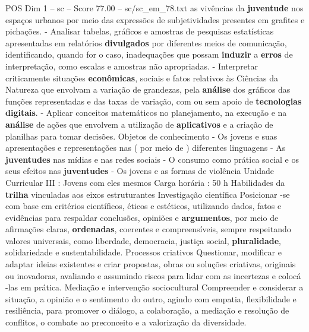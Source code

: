 \begin{textsample}{POS Dim 1 – sc – Score 77.00 – sc/sc\_em\_78.txt}
as vivências da \textbf{juventude} nos espaços urbanos por meio das expressões de subjetividades presentes em grafites e pichações. - Analisar tabelas, gráficos e amostras de pesquisas estatísticas apresentadas em relatórios \textbf{divulgados} por diferentes meios de comunicação, identificando, quando for o caso, inadequações que possam \textbf{induzir} a \textbf{erros} de interpretação, como escalas e amostras não apropriadas. - Interpretar criticamente situações \textbf{econômicas}, sociais e fatos relativos às Ciências da Natureza que envolvam a variação de grandezas, pela \textbf{análise} dos gráficos das funções representadas e das taxas de variação, com ou sem apoio de \textbf{tecnologias} \textbf{digitais}. - Aplicar conceitos matemáticos no planejamento, na execução e na \textbf{análise} de ações que envolvem a utilização de \textbf{aplicativos} e a criação de planilhas para tomar decisões.
Objetos de conhecimento - Os jovens e suas apresentações e representações nas ( por meio de ) diferentes linguagens - As \textbf{juventudes} nas mídias e nas redes sociais - O consumo como prática social e os seus efeitos nas \textbf{juventudes} - Os jovens e as formas de violência Unidade Curricular III : Jovens com eles mesmos Carga horária : 50 h Habilidades da \textbf{trilha} vinculadas aos eixos estruturantes Investigação científica Posicionar -se com base em critérios científicos, éticos e estéticos, utilizando dados, fatos e evidências para respaldar conclusões, opiniões e \textbf{argumentos}, por meio de afirmações claras, \textbf{ordenadas}, coerentes e compreensíveis, sempre respeitando valores universais, como liberdade, democracia, justiça social, \textbf{pluralidade}, solidariedade e sustentabilidade.
Processos criativos Questionar, modificar e adaptar ideias existentes e criar propostas, obras ou soluções criativas, originais ou inovadoras, avaliando e assumindo riscos para lidar com as incertezas e colocá -las em prática.
Mediação e intervenção sociocultural Compreender e considerar a situação, a opinião e o sentimento do outro, agindo com empatia, flexibilidade e resiliência, para promover o diálogo, a colaboração, a mediação e resolução de conflitos, o combate ao preconceito e a valorização da diversidade.

\end{textsample}
